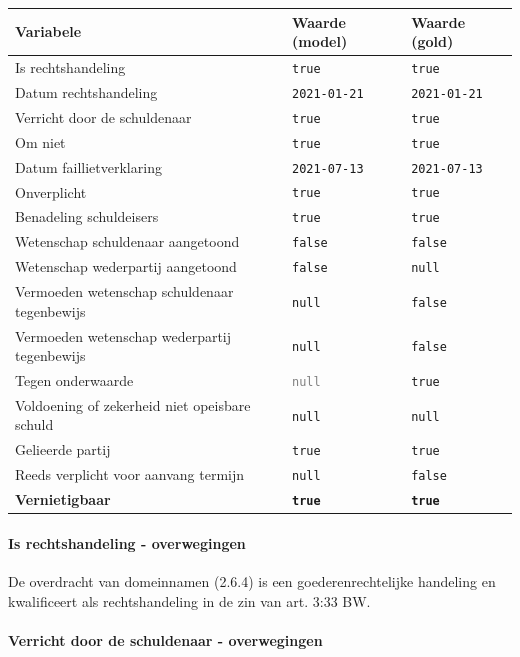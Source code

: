 \documentclass[
  dutch,
  a4paper,
]{article}
\begin{document}
\begin{center}
\small
\begin{tabular}{@{}p{7.4cm}p{2.6cm}p{2.6cm}@{}}
\toprule
Variabele & Waarde (model) & Waarde (gold) \\
\midrule
Is rechtshandeling & \texttt{true} & \texttt{true} \\
Datum rechtshandeling & \texttt{2021-01-21} & \texttt{2021-01-21} \\
Verricht door de schuldenaar & \texttt{true} & \texttt{true} \\
Om niet & \texttt{true} & \texttt{true} \\
Datum faillietverklaring & \texttt{2021-07-13} & \texttt{2021-07-13} \\
Onverplicht & \texttt{true} & \texttt{true} \\
Benadeling schuldeisers & \texttt{true} & \texttt{true} \\
Wetenschap schuldenaar aangetoond & \texttt{false} & \texttt{false} \\
Wetenschap wederpartij aangetoond & \texttt{false} & \texttt{null} \\
Vermoeden wetenschap schuldenaar tegenbewijs & \texttt{null} & \texttt{false} \\
Vermoeden wetenschap wederpartij tegenbewijs & \texttt{null} & \texttt{false} \\
Tegen onderwaarde & \textcolor{gray}{\texttt{null}} & \texttt{true} \\
Voldoening of zekerheid niet opeisbare schuld & \texttt{null} & \texttt{null} \\
Gelieerde partij & \texttt{true} & \texttt{true} \\
Reeds verplicht voor aanvang termijn & \texttt{null} & \texttt{false} \\
\textbf{Vernietigbaar} & \textbf{\texttt{true}} & \textbf{\texttt{true}} \\
\bottomrule
\end{tabular}
\end{center}

\paragraph{Is rechtshandeling - overwegingen}\label{is-rechtshandeling---overwegingen-18}

De overdracht van domeinnamen (2.6.4) is een goederenrechtelijke handeling en kwalificeert als rechtshandeling in de zin van art. 3:33 BW.

\paragraph{Verricht door de schuldenaar - overwegingen}\label{verricht-door-de-schuldenaar---overwegingen-18}
\end{document}
